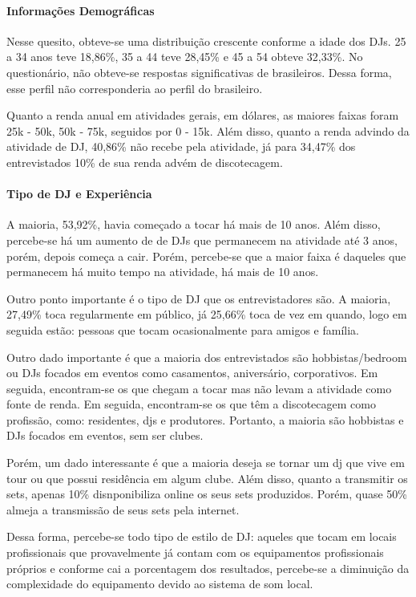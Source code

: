\paragraph{Informações Demográficas}
Nesse quesito, obteve-se uma distribuição crescente conforme a idade dos DJs. 25 a 34 anos teve 18,86\%, 35 a 44 teve 28,45\% e 45 a 54 obteve 32,33\%. No questionário, não obteve-se respostas significativas de brasileiros. Dessa forma, esse perfil não corresponderia ao perfil do brasileiro.
\par
Quanto a renda anual em atividades gerais, em dólares, as maiores faixas foram 25k - 50k, 50k - 75k, seguidos por 0 - 15k. Além disso, quanto a renda advindo da atividade de DJ, 40,86\% não recebe pela atividade, já para 34,47\% dos entrevistados 10\% de sua renda advém de discotecagem.

\paragraph{Tipo de DJ e Experiência}
A maioria, 53,92\%, havia começado a tocar há mais de 10 anos. Além disso, percebe-se há um aumento de de DJs que permanecem na atividade até 3 anos, porém, depois começa a cair. Porém, percebe-se que a maior faixa é daqueles que permanecem há muito tempo na atividade, há mais de 10 anos.
\par
Outro ponto importante é o tipo de DJ que os entrevistadores são. A maioria, 27,49\% toca regularmente em público, já 25,66\% toca de vez em quando, logo em seguida estão: pessoas que tocam ocasionalmente para amigos e família.
\par
Outro dado importante é que a maioria dos entrevistados são hobbistas/bedroom ou DJs focados em eventos como casamentos, aniversário, corporativos. Em seguida, encontram-se os que chegam a tocar mas não levam a atividade como fonte de renda. Em seguida, encontram-se os que têm a discotecagem como profissão, como: residentes, djs e produtores. Portanto, a maioria são hobbistas e DJs focados em eventos, sem ser clubes.
\par
Porém, um dado interessante é que a maioria deseja se tornar um dj que vive em tour ou que possui residência em algum clube. Além disso, quanto a transmitir os sets, apenas 10\% disnponibiliza online os seus sets produzidos. Porém, quase 50\% almeja a transmissão de seus sets pela internet.
\par
Dessa forma, percebe-se todo tipo de estilo de DJ: aqueles que tocam em locais profissionais que provavelmente já contam com os equipamentos profissionais próprios e conforme cai a porcentagem dos resultados, percebe-se a diminuição da complexidade do equipamento devido ao sistema de som local.

